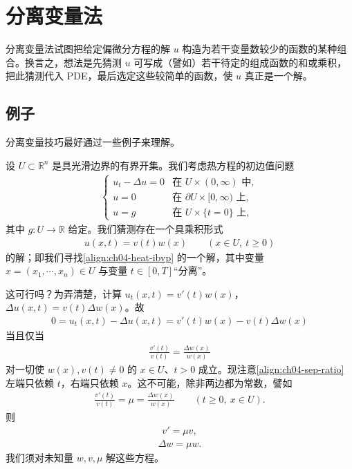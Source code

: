 \documentclass[../../main.tex]{subfiles}
\begin{document}
\section{分离变量法}\label{section:ch04-sepvar}

分离变量法试图把给定偏微分方程的解 $u$ 构造为若干变量数较少的函数的某种组合。换言之，想法是先猜测 $u$ 可写成（譬如）若干待定的组成函数的和或乘积，把此猜测代入 PDE，最后选定这些较简单的函数，使 $u$ 真正是一个解。

\subsection{例子}\label{subsection:ch04-sepvar-ex}

分离变量技巧最好通过一些例子来理解。

\begin{example}\label{example:ch04-heat-sep}
设 $U\subset\mathbb{R}^n$ 是具光滑边界的有界开集。我们考虑热方程的初边值问题
\begin{align}\label{align:ch04-heat-ibvp}
\begin{cases}
u_t-\Delta u=0 & \text{在 }U\times(0,\infty)\text{ 中},\\
u=0 & \text{在 }\partial U\times[0,\infty)\text{ 上},\\
u=g & \text{在 }U\times\{t=0\}\text{ 上},
\end{cases}
\end{align}
其中 $g:U\to\mathbb{R}$ 给定。我们猜测存在一个具乘积形式
\begin{align}\label{align:ch04-sep-product}
u(x,t)=v(t)w(x) \qquad(x\in U,\ t\geqslant 0)
\end{align}
的解；即我们寻找\eqref{align:ch04-heat-ibvp} 的一个解，其中变量 $x=(x_1,\cdots,x_n)\in U$ 与变量 $t\in[0,T]$``分离''。

这可行吗？为弄清楚，计算 $u_t(x,t)=v'(t)w(x)$，$\Delta u(x,t)=v(t)\Delta w(x)$。故
\begin{align*}
0=u_t(x,t)-\Delta u(x,t)=v'(t)w(x)-v(t)\Delta w(x)
\end{align*}
当且仅当
\begin{align}\label{align:ch04-sep-ratio}
\frac{v'(t)}{v(t)}=\frac{\Delta w(x)}{w(x)}
\end{align}
对一切使 $w(x),v(t)\neq 0$ 的 $x\in U$、$t>0$ 成立。现注意\eqref{align:ch04-sep-ratio} 左端只依赖 $t$，右端只依赖 $x$。这不可能，除非两边都为常数，譬如
\begin{align*}
\frac{v'(t)}{v(t)}=\mu=\frac{\Delta w(x)}{w(x)} \qquad(t\geqslant 0,\ x\in U).
\end{align*}
则
\begin{align}\label{align:ch04-v-ode}
v'=\mu v,
\end{align}
\begin{align}\label{align:ch04-w-pde}
\Delta w=\mu w.
\end{align}
我们须对未知量 $w,v,\mu$ 解这些方程。


\end{example}
\end{document}
